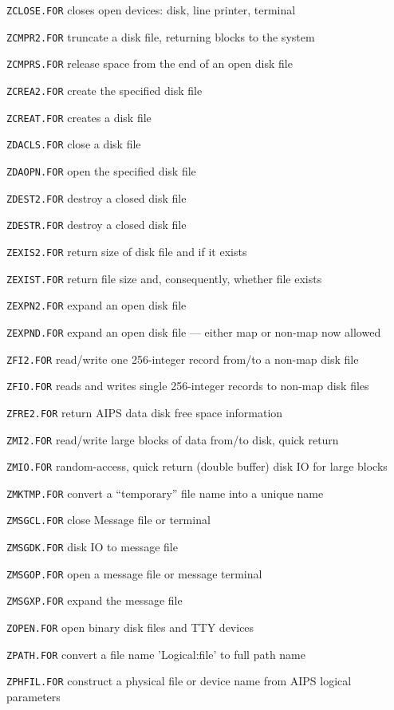 {\item{\tt ZCLOSE.FOR} closes open devices: disk, line printer, terminal
\item{\tt ZCMPR2.FOR} truncate a disk file, returning blocks to the system
\item{\tt ZCMPRS.FOR} release space from the end of an open disk file
\item{\tt ZCREA2.FOR} create the specified disk file
\item{\tt ZCREAT.FOR} creates a disk file
\item{\tt ZDACLS.FOR} close a disk file
\item{\tt ZDAOPN.FOR} open the specified disk file
\item{\tt ZDEST2.FOR} destroy a closed disk file
\item{\tt ZDESTR.FOR} destroy a closed disk file
\item{\tt ZEXIS2.FOR} return size of disk file and if  it exists
\item{\tt ZEXIST.FOR} return file size and, consequently, whether file exists
\item{\tt ZEXPN2.FOR} expand an open disk file
\item{\tt ZEXPND.FOR} expand an open disk file --- either map or non-map now allowed
\item{\tt ZFI2.FOR} read/write one 256-integer record from/to a non-map disk file
\item{\tt ZFIO.FOR} reads and writes single 256-integer records to non-map disk files
\item{\tt ZFRE2.FOR} return AIPS data disk free space information
\item{\tt ZMI2.FOR} read/write large blocks of data from/to disk, quick return
\item{\tt ZMIO.FOR} random-access, quick return (double buffer) disk IO for large blocks
\item{\tt ZMKTMP.FOR} convert a ``temporary'' file name into a unique name
\item{\tt ZMSGCL.FOR} close Message file or terminal
\item{\tt ZMSGDK.FOR} disk IO to message file
\item{\tt ZMSGOP.FOR} open a message file or message terminal
\item{\tt ZMSGXP.FOR} expand the message file
\item{\tt ZOPEN.FOR} open binary disk files and  TTY devices
\item{\tt ZPATH.FOR} convert a file name 'Logical:file' to full path name
\item{\tt ZPHFIL.FOR} construct a physical file or device name from AIPS logical parameters
}
